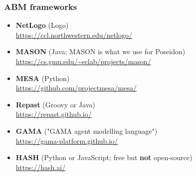 \documentclass[table, 14pt, aspectratio=169]{beamer}
\newcommand{\hl}[1]{\textcolor{OxfordBlue}{\textbf{#1}}}
\begin{document}
\begin{frame}[t]
\end{frame}

\begin{frame}[t]\frametitle{ABM frameworks}
  \footnotesize
  \begin{itemize}
    \item
      \hl{NetLogo} (Logo)\\
      \url{https://ccl.northwestern.edu/netlogo/}
    \item
      \hl{MASON} (Java; MASON is what we use for Poseidon)\\
      \url{https://cs.gmu.edu/~eclab/projects/mason/}\\
    \item
      \hl{MESA} (Python)\\
      \url{https://github.com/projectmesa/mesa/}
    \item
      \hl{Repast} (Groovy or Java)\\
      \url{https://repast.github.io/}      
    \item
      \hl{GAMA} ("GAMA agent modelling language")\\
      \url{https://gama-platform.github.io/}      
    \item
      \hl{HASH} (Python or JavaScript; free but \hl{not} open-source)\\
      \url{https://hash.ai/}
  \end{itemize}
\end{frame}
\end{document}
